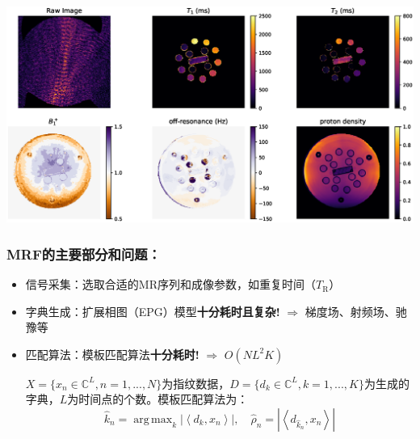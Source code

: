 \documentclass{beamer}
\DeclareMathOperator*{\argmax}{arg\,max}
\begin{document}
\begin{frame}
\hspace{-1.5cm}
	\begin{minipage}{1\textwidth}
		\centering
		\includegraphics[width=1.2\textwidth]{../img/intro/mrfmap}
	\end{minipage}
\end{frame}

\begin{frame}
	\frametitle{MRF的主要部分和问题：}
	\begin{itemize}
		\item 信号采集：选取合适的MR序列和成像参数，如重复时间（$T_\mathrm{R}$）
		\item 字典生成：扩展相图（EPG）模型\textbf{十分耗时且复杂!} $\Rightarrow$ 梯度场、射频场、驰豫等
		\item 匹配算法：模板匹配算法\textbf{十分耗时!} $\Rightarrow$ $O(NL^2K)$
		
		$X=\{x_n\in \mathbb{C}^L, n=1,...,N\}$为指纹数据，$D=\{d_k\in \mathbb{C}^L,k=1,...,K\}$为生成的字典，$L$为时间点的个数。模板匹配算法为：
			\begin{equation*}
	\hat{k}_n = \argmax_k \left|\left\langle d_k,x_n \right\rangle \right|,\quad
	\hat{\rho}_n= \left|\left\langle d_{\hat{k}_n},x_n \right\rangle \right|
	\end{equation*}
	\end{itemize}
	
\end{frame}


\end{document}
